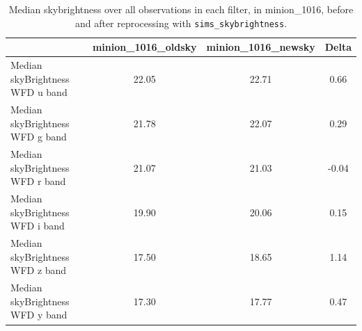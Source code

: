 \documentclass[DM,authoryear,toc]{lsstdoc}
\newcommand{\simsky}{\texttt{sims\_skybrightness}\xspace}
\begin{document}
\begin{table}[htp]
\caption{Median skybrightness over all observations in each filter, in minion\_1016, before and after reprocessing with \simsky.}
\begin{center}
\begin{tabular}{lccc}
\toprule
{} &  minion\_1016\_oldsky &  minion\_1016\_newsky &    Delta \\
\midrule
Median skyBrightness WFD u band &               22.05 &               22.71 &   0.66 \\
Median skyBrightness WFD g band &               21.78 &               22.07 &   0.29 \\
Median skyBrightness WFD r band &               21.07 &               21.03 &  -0.04 \\
Median skyBrightness WFD i band &               19.90 &               20.06 &   0.15 \\
Median skyBrightness WFD z band &               17.50 &               18.65 &   1.14 \\
Median skyBrightness WFD y band &               17.30 &               17.77 &   0.47 \\
\bottomrule
\end{tabular}
\end{center}
\label{tab:medskybright}
\end{table}
\end{document}
